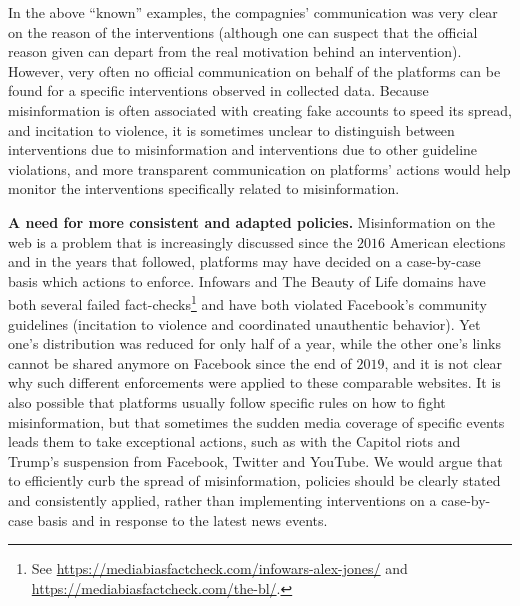\documentclass{article}
\begin{document}
In the above ``known'' examples, the compagnies' communication was very clear on the reason of the interventions (although one can suspect that the official reason given can depart from the real motivation behind an intervention). 
However, very often no official communication on behalf of the platforms can be found for a specific interventions observed in collected data. 
Because misinformation is often associated with creating fake accounts to speed its spread, and incitation to violence, it is sometimes unclear to distinguish between interventions due to misinformation and interventions due to other guideline violations, and more transparent communication on platforms' actions would help monitor the interventions specifically related to misinformation.

\smallskip

{\bf A need for more consistent and adapted policies.} Misinformation on the web is a problem that is increasingly discussed since the $2016$ American elections and in the years that followed, platforms may have decided on a case-by-case basis which actions to enforce.
Infowars and The Beauty of Life domains have both several failed fact-checks\footnote{See \href{https://mediabiasfactcheck.com/infowars-alex-jones/}{https://mediabiasfactcheck.com/infowars-alex-jones/}  and \href{https://mediabiasfactcheck.com/the-bl/}{https://mediabiasfactcheck.com/the-bl/}.} and have both violated Facebook's community guidelines (incitation to violence and coordinated unauthentic behavior). 
Yet one's distribution was reduced for only half of a year, while the other one's links cannot be shared anymore on Facebook since the end of $2019$, and it is not clear why such different enforcements were applied to these comparable websites.
It is also possible that platforms usually follow specific rules on how to fight misinformation, but that sometimes the sudden media coverage of specific events leads them to take exceptional actions, such as with the Capitol riots and Trump's suspension from Facebook, Twitter and YouTube.
We would argue that to efficiently curb the spread of misinformation, policies should be clearly stated and consistently applied, rather than implementing interventions on a case-by-case basis and in response to the latest news events.

\smallskip
\end{document}
